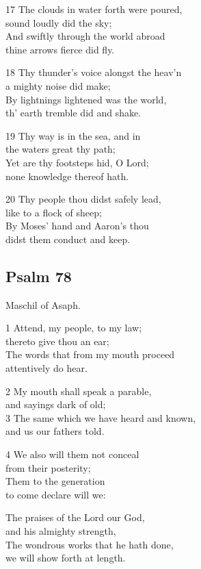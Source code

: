17 The clouds in water forth were poured,\\
sound loudly did the sky;\\
And swiftly through the world abroad\\
thine arrows fierce did fly.

18 Thy thunder’s voice alongst the heav’n\\
a mighty noise did make;\\
By lightnings lightened was the world,\\
th’ earth tremble did and shake.

19 Thy way is in the sea, and in\\
the waters great thy path;\\
Yet are thy footsteps hid, O Lord;\\
none knowledge thereof hath.

20 Thy people thou didst safely lead,\\
like to a flock of sheep;\\
By Moses’ hand and Aaron’s thou\\
didst them conduct and keep.

\begin{center}
\quad{}\quad{}
\end{center}

\subsection*{Psalm 78}

Maschil of Asaph.


1 Attend, my people, to my law;\\
thereto give thou an ear;\\
The words that from my mouth proceed\\
attentively do hear.

2 My mouth shall speak a parable,\\
and sayings dark of old;\\
3 The same which we have heard and known,\\
and us our fathers told.

4 We also will them not conceal\\
from their posterity;\\
Them to the generation\\
to come declare will we:

The praises of the Lord our God,\\
and his almighty strength,\\
The wondrous works that he hath done,\\
we will show forth at length.

